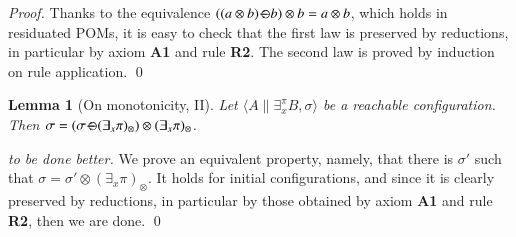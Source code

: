 \documentclass[preprint,12pt]{elsarticle}
\newtheorem{lemma}{Lemma}
\newtheorem{proof}{Proof}
\def\odiv{\, {\ominus\hspace{-7.7pt} \div} \,}
\begin{document}
	
	\begin{proof}
		Thanks to the equivalence $((a \otimes b) \odiv b) \otimes b = a \otimes b$, which holds in residuated POMs,
		it is easy to check that the first law is preserved by reductions,
		in particular by axiom \mbox{\bf A1} and rule \mbox{\bf R2}.
		The second law is proved by induction on rule application.
		\qed
	\end{proof}
	
	
	\setcounter{lemma}{8}
	\begin{lemma}[On monotonicity, II]
		\label{mono2}
		Let $\langle A \parallel \exists_x^\pi B, \sigma \rangle$ 
		be a reachable configuration.
		Then $\sigma = (\sigma \odiv (\exists_x \pi)_\otimes) \otimes (\exists_x \pi)_\otimes$.
	\end{lemma}
	\begin{proof}[to be done better]
		We prove an equivalent property, namely, that there is $\sigma'$ such that 
		$\sigma = \sigma' \otimes (\exists_x \pi)_\otimes$. 
		It holds for initial configurations, and since it is clearly preserved by reductions, 
		in particular by those obtained by axiom \mbox{\bf A1} and rule \mbox{\bf R2},
		then we are done.
		\qed
	\end{proof}
	
\end{document}
